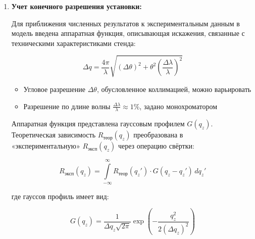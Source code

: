 \documentclass[a4paper]{article}
\begin{document}
\begin{enumerate}
\begin{equation}
    P(q_{\alpha}, d_{\alpha}) = \(
\begin{bmatrix}
e^{-iq_{\alpha}d_{\alpha}} & 0\\
0 & e^{iq_{\alpha}d_{\alpha}}
\end{bmatrix}
\)
\end{equation}

Так, при использовании формул (21), (22), (23), (24), численно считается как модуль, так и фаза коэффициента отражения нейтронов от образца, при заданных параметрах его структуры.
Наибольшую трудоёмкость с точки счёта вызывает вычисление матрицы передачи (22). Вычисления кратно ускорены, так как векторизованы, что позволяет переложить их на ядра CUDA, или задействовать векторные инструкции процессора. 

\item \textbf{Учет конечного разрешения установки:}

Для приближения численных результатов к экспериментальным данным в модель введена аппаратная функция, описывающая искажения, связанные с техническими характеристиками стенда:

\begin{equation}
\Delta q = \frac{4\pi}{\lambda} \sqrt{(\Delta\theta)^2 + \theta^2\left(\frac{\Delta\lambda}{\lambda}\right)^2}
\end{equation}

\begin{itemize}
\item Угловое разрешение $\Delta\theta$, обусловленное коллимацией, можно варьировать
\item Разрешение по длине волны $\frac{\Delta\lambda}{\lambda} \approx 1\%$, задано монохроматором
\end{itemize}

Аппаратная функция представлена гауссовым профилем $G(q_z)$. Теоретическая зависимость $R_{\text{теор}}(q_z)$ преобразована в «экспериментальную» $R_{\text{эксп}}(q_z)$ через операцию свёртки:

\begin{equation}
R_{\text{эксп}}(q_z) = \int\limits_{-\infty}^{\infty} R_{\text{теор}}(q_z') \cdot G(q_z - q_z') \, dq_z'
\end{equation}

где гауссов профиль имеет вид:

\begin{equation}
G(q_z) = \frac{1}{\Delta q_z\sqrt{2\pi}} \exp\left(-\frac{q_z^2}{2(\Delta q_z)^2}\right)
\end{equation}


\end{enumerate}
\end{document}
